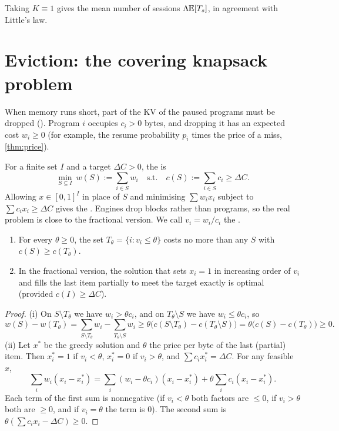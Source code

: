 Taking $K\equiv1$ gives the mean number of sessions $\Lambda\mathbb{E}[T_s]$, in agreement
with Little's law.

\section{Eviction: the covering knapsack problem}\label{L4:sec:knapsack}

When memory runs short, part of the KV of the paused programs must be dropped
(). Program $i$ occupies $c_i>0$ bytes, and dropping it has an
expected cost $w_i\ge0$ (for example, the resume probability $p_i$ times the price
of a miss, \cref{thm:price}).

\begin{definition}\label{L4:def:knapsack}
For a finite set $I$ and a target $\Delta C>0$, the  is
\[
  \min_{S\subseteq I}\ w(S):=\sum_{i\in S}w_i\quad\text{s.t.}\quad c(S):=\sum_{i\in S}c_i\ge\Delta C .
\]
Allowing $x\in[0,1]^I$ in place of $S$ and minimising $\sum w_ix_i$ subject to
$\sum c_ix_i\ge\Delta C$ gives the . Engines drop blocks
rather than programs, so the real problem is close to the fractional version. We
call $v_i=w_i/c_i$ the .
\end{definition}

\begin{theorem}\label{thm:threshold}
\begin{enumerate}[label=(\roman*)]
\item For every $\theta\ge0$, the set $T_\theta=\{i:v_i\le\theta\}$ costs no more
  than any $S$ with $c(S)\ge c(T_\theta)$.
\item In the fractional version, the solution that sets $x_i=1$ in increasing
  order of $v_i$ and fills the last item partially to meet the target exactly is
  optimal (provided $c(I)\ge\Delta C$).
\end{enumerate}
\end{theorem}

\begin{proof}
(i) On $S\setminus T_\theta$ we have $w_i>\theta c_i$, and on $T_\theta\setminus S$
we have $w_i\le\theta c_i$, so
\[
  w(S)-w(T_\theta)=\sum_{S\setminus T_\theta}w_i-\sum_{T_\theta\setminus S}w_i
  \ge\theta\bigl(c(S\setminus T_\theta)-c(T_\theta\setminus S)\bigr)=\theta\bigl(c(S)-c(T_\theta)\bigr)\ge0 .
\]
(ii) Let $x^*$ be the greedy solution and $\theta$ the price per byte of the last
(partial) item. Then $x^*_i=1$ if $v_i<\theta$, $x^*_i=0$ if $v_i>\theta$, and
$\sum c_ix^*_i=\Delta C$. For any feasible $x$,
\[
  \sum_iw_i(x_i-x^*_i)=\sum_i(w_i-\theta c_i)(x_i-x^*_i)+\theta\sum_ic_i(x_i-x^*_i) .
\]
Each term of the first sum is nonnegative (if $v_i<\theta$ both factors are
$\le0$, if $v_i>\theta$ both are $\ge0$, and if $v_i=\theta$ the term is $0$). The
second sum is $\theta(\sum c_ix_i-\Delta C)\ge0$.
\end{proof}

